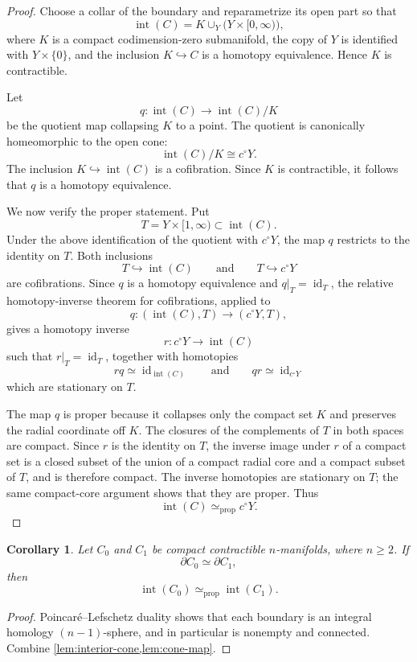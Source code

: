 \documentclass[10pt,reqno]{amsart}
\numberwithin{equation}{section}
\newtheorem{corollary}{Corollary}
\theoremstyle{definition}
\theoremstyle{remark}
\newcommand{\Int}{\operatorname{int}}
\newcommand{\id}{\operatorname{id}}
\newcommand{\simeqp}{\simeq_{\mathrm{prop}}}
\begin{document}
\begin{proof}
Choose a collar of the boundary and reparametrize its open part so
that
\[
\Int(C)=K\cup_Y\bigl(Y\times[0,\infty)\bigr),
\]
where \(K\) is a compact codimension-zero submanifold, the copy of
\(Y\) is identified with \(Y\times\{0\}\), and the inclusion
\(K\hookrightarrow C\) is a homotopy equivalence.  Hence \(K\) is
contractible.

Let
\[
q\colon \Int(C)\longrightarrow \Int(C)/K
\]
be the quotient map collapsing \(K\) to a point.  The quotient is
canonically homeomorphic to the open cone:
\[
\Int(C)/K\cong c^\circ Y.
\]
The inclusion \(K\hookrightarrow\Int(C)\) is a cofibration.  Since
\(K\) is contractible, it follows that \(q\) is a homotopy equivalence.

We now verify the proper statement.  Put
\[
T=Y\times[1,\infty)\subset\Int(C).
\]
Under the above identification of the quotient with \(c^\circ Y\),
the map \(q\) restricts to the identity on \(T\).  Both inclusions
\[
T\hookrightarrow\Int(C)
\qquad\text{and}\qquad
T\hookrightarrow c^\circ Y
\]
are cofibrations.  Since \(q\) is a homotopy equivalence and
\(q|_T=\id_T\), the relative homotopy-inverse theorem for
cofibrations, applied to
\[
q\colon(\Int(C),T)\longrightarrow(c^\circ Y,T),
\]
gives a homotopy inverse
\[
r\colon c^\circ Y\longrightarrow\Int(C)
\]
such that \(r|_T=\id_T\), together with homotopies
\[
rq\simeq\id_{\Int(C)}
\qquad\text{and}\qquad
qr\simeq\id_{c^\circ Y}
\]
which are stationary on \(T\).

The map \(q\) is proper because it collapses only the compact set
\(K\) and preserves the radial coordinate off \(K\).  The closures
of the complements of \(T\) in both spaces are compact.  Since \(r\)
is the identity on \(T\), the inverse image under \(r\) of a compact
set is a closed subset of the union of a compact radial core and a
compact subset of \(T\), and is therefore compact.  The inverse
homotopies are stationary on \(T\); the same compact-core argument
shows that they are proper.  Thus
\[
\Int(C)\simeqp c^\circ Y.
\]
\end{proof}

\begin{corollary}\label{cor:boundary-homotopy-proper}
Let \(C_0\) and \(C_1\) be compact contractible \(n\)-manifolds,
where \(n\geq2\).  If
\[
\partial C_0\simeq\partial C_1,
\]
then
\[
\Int(C_0)\simeqp\Int(C_1).
\]
\end{corollary}

\begin{proof}
Poincar\'e--Lefschetz duality shows that each boundary is an integral
homology \((n-1)\)-sphere, and in particular is nonempty and connected.
Combine \cref{lem:interior-cone,lem:cone-map}.
\end{proof}
\end{document}
